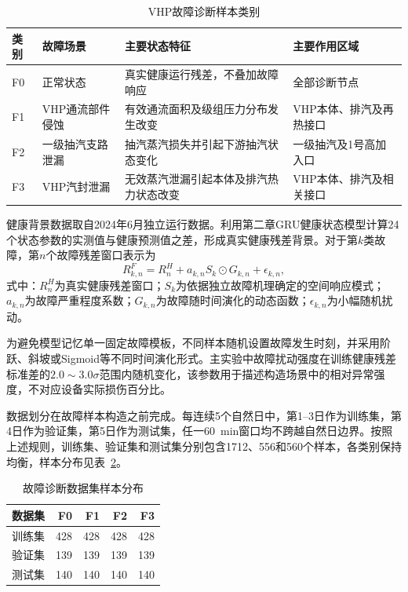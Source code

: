 \begin{table}[htbp]
    \centering
    \caption{VHP故障诊断样本类别}
    \label{tab:fault_classes_v8}
    \begin{tabular}{p{1.0cm}p{4.2cm}p{5.2cm}p{3.3cm}}
        \toprule
        类别 & 故障场景 & 主要状态特征 & 主要作用区域 \\
        \midrule
        F0 & 正常状态 & 真实健康运行残差，不叠加故障响应 & 全部诊断节点 \\
        F1 & VHP通流部件侵蚀 & 有效通流面积及级组压力分布发生改变 & VHP本体、排汽及再热接口 \\
        F2 & 一级抽汽支路泄漏 & 抽汽蒸汽损失并引起下游抽汽状态变化 & 一级抽汽及1号高加入口 \\
        F3 & VHP汽封泄漏 & 无效蒸汽泄漏引起本体及排汽热力状态改变 & VHP本体、排汽及相关接口 \\
        \bottomrule
    \end{tabular}
\end{table}

健康背景数据取自2024年6月独立运行数据。利用第二章GRU健康状态模型计算24个状态参数的实测值与健康预测值之差，形成真实健康残差背景。对于第$k$类故障，第$n$个故障残差窗口表示为
\begin{equation}
R_{k,n}^{F}=R_n^{H}+a_{k,n}S_k\odot G_{k,n}+\epsilon_{k,n},
\end{equation}
式中：$R_n^{H}$为真实健康残差窗口；$S_k$为依据独立故障机理确定的空间响应模式；$a_{k,n}$为故障严重程度系数；$G_{k,n}$为故障随时间演化的动态函数；$\epsilon_{k,n}$为小幅随机扰动。

为避免模型记忆单一固定故障模板，不同样本随机设置故障发生时刻，并采用阶跃、斜坡或Sigmoid等不同时间演化形式。主实验中故障扰动强度在训练健康残差标准差的$2.0\sim3.0\sigma$范围内随机变化，该参数用于描述构造场景中的相对异常强度，不对应设备实际损伤百分比。

数据划分在故障样本构造之前完成。每连续5个自然日中，第1--3日作为训练集，第4日作为验证集，第5日作为测试集，任一60~min窗口均不跨越自然日边界。按照上述规则，训练集、验证集和测试集分别包含1712、556和560个样本，各类别保持均衡，样本分布见表~\ref{tab:fault_split_v8}。

\begin{table}[htbp]
    \centering
    \caption{故障诊断数据集样本分布}
    \label{tab:fault_split_v8}
    \begin{tabular}{lrrrr}
        \toprule
        数据集 & F0 & F1 & F2 & F3 \\
        \midrule
        训练集 & 428 & 428 & 428 & 428 \\
        验证集 & 139 & 139 & 139 & 139 \\
        测试集 & 140 & 140 & 140 & 140 \\
        \bottomrule
    \end{tabular}
\end{table}

